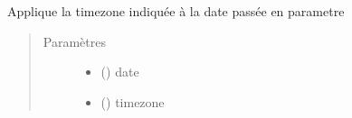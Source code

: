 \documentclass[letterpaper,10pt,french]{sphinxmanual}
\begin{document}
\begin{fulllineitems}
\label{\detokenize{modules/dtemng:toolbox.dtemng.set_timezone}}
Applique la timezone indiquée à la date passée en parametre
\begin{quote}\begin{description}
\item[{Paramètres}] \leavevmode\begin{itemize}
\item {} 
 () \textendash{} date

\item {} 
 () \textendash{} timezone

\end{itemize}

\end{description}\end{quote}

\end{fulllineitems}

\end{document}
